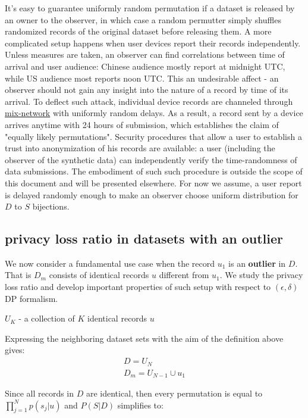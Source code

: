 \documentclass[11pt]{article}
\begin{document}
It's easy to guarantee uniformly random permutation if a dataset is released by an owner to the observer, in which case a random permutter simply shuffles randomized records of the original dataset before releasing them.  A more complicated setup happens when user devices report their records independently.  Unless measures are taken, an observer can find correlations between time of arrival and user audience:  Chinese audience mostly report at midnight UTC, while US audience most reports noon UTC.  This an undesirable affect - an observer should not gain any insight into the nature of a record by time of its arrival.  To deflect such attack, individual device records are channeled through \href{https://leastauthority.com/blog/mixnet-intro/}{mix-network} with uniformly random delays.  As a result, a record sent by a device arrives anytime with 24 hours of submission, which establishes the claim of "equally likely permutations".  Security procedures that allow a user to establish a trust into anonymization of his records are available: a user (including the observer of the synthetic data) can independently verify the time-randomness of data submissions.  The embodiment of such such procedure is outside the scope of this document and will be presented elsewhere.  For now we assume, a user report is delayed randomly enough to make an observer choose uniform distribution for $D$ to $S$ bijections.


\subsection{privacy loss ratio in datasets with an outlier}

We now consider a fundamental use case when the record $u_1$ is an  \textbf{outlier}  in $D$.  That is $D_m$ consists of identical records $u$ different from $u_1$.  We study the privacy loss ratio and develop important properties of such setup with respect to $(\epsilon, \delta)$ DP formalism.

\begin{defn}
$U_K$ - a collection of $K$ identical records $u$
\end{defn}

Expressing the neighboring dataset sets with the aim of the definition above gives:
\begin{align}
D = U_N  \\
D_m = U_{N-1} \cup u_1
\end{align}

Since all records in $D$ are identical, then every permutation is equal to $\prod_{j=1}^N p(s_j | u)$ and $P(S|D)$ simplifies to:
\end{document}
